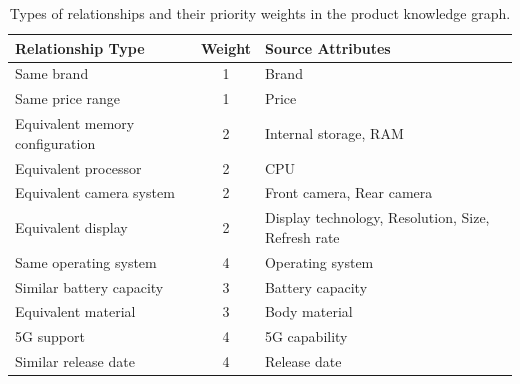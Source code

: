 \begin{table}[!t]
    \centering
    \caption{Types of relationships and their priority weights in the product knowledge graph.}
    \label{tab:relationships}
    \begin{tabularx}{\columnwidth}{|l|c|X|}
        \hline
        \textbf{Relationship Type} & \textbf{Weight} & \textbf{Source Attributes} \\
        \hline
        Same brand & 1 & Brand \\ \hline
        Same price range & 1 & Price \\ \hline
        Equivalent memory configuration & 2 & Internal storage, RAM \\ \hline
        Equivalent processor & 2 & CPU \\ \hline
        Equivalent camera system & 2 & Front camera, Rear camera \\ \hline
        Equivalent display & 2 & Display technology, Resolution, Size, Refresh rate \\ \hline
        Same operating system & 4 & Operating system \\ \hline
        Similar battery capacity & 3 & Battery capacity \\ \hline
        Equivalent material & 3 & Body material \\ \hline
        5G support & 4 & 5G capability \\ \hline
        Similar release date & 4 & Release date \\
        \hline
    \end{tabularx}
\end{table}

